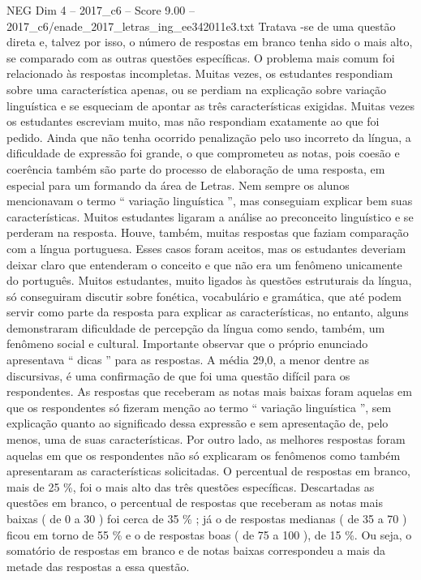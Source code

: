 \begin{textsample}{NEG Dim 4 – 2017\_c6 – Score 9.00 – 2017\_c6/enade\_2017\_letras\_ing\_ee342011e3.txt}
Tratava -se de uma questão direta e, talvez por isso, o número de respostas em branco tenha sido o mais alto, se comparado com as outras questões específicas.
O problema mais comum foi relacionado às respostas incompletas.
Muitas vezes, os estudantes respondiam sobre uma característica apenas, ou se perdiam na explicação sobre variação linguística e se esqueciam de apontar as três características exigidas.
Muitas vezes os estudantes escreviam muito, mas não respondiam exatamente ao que foi pedido.
Ainda que não tenha ocorrido penalização pelo uso incorreto da língua, a dificuldade de expressão foi grande, o que comprometeu as notas, pois coesão e coerência também são parte do processo de elaboração de uma resposta, em especial para um formando da área de Letras.
Nem sempre os alunos mencionavam o termo “ variação linguística ”, mas conseguiam explicar bem suas características.
Muitos estudantes ligaram a análise ao preconceito linguístico e se perderam na resposta.
Houve, também, muitas respostas que faziam comparação com a língua portuguesa.
Esses casos foram aceitos, mas os estudantes deveriam deixar claro que entenderam o conceito e que não era um fenômeno unicamente do português.
Muitos estudantes, muito ligados às questões estruturais da língua, só conseguiram discutir sobre fonética, vocabulário e gramática, que até podem servir como parte da resposta para explicar as características, no entanto, alguns demonstraram dificuldade de percepção da língua como sendo, também, um fenômeno social e cultural.
Importante observar que o próprio enunciado apresentava “ dicas ” para as respostas.
A média 29,0, a menor dentre as discursivas, é uma confirmação de que foi uma questão difícil para os respondentes.
As respostas que receberam as notas mais baixas foram aquelas em que os respondentes só fizeram menção ao termo “ variação linguística ”, sem explicação quanto ao significado dessa expressão e sem apresentação de, pelo menos, uma de suas características.
Por outro lado, as melhores respostas foram aquelas em que os respondentes não só explicaram os fenômenos como também apresentaram as características solicitadas.
O percentual de respostas em branco, mais de 25 \%, foi o mais alto das três questões específicas.
Descartadas as questões em branco, o percentual de respostas que receberam as notas mais baixas ( de 0 a 30 ) foi cerca de 35 \% ; já o de respostas medianas ( de 35 a 70 ) ficou em torno de 55 \% e o de respostas boas ( de 75 a 100 ), de 15 \%.
Ou seja, o somatório de respostas em branco e de notas baixas correspondeu a mais da metade das respostas a essa questão.

\end{textsample}
